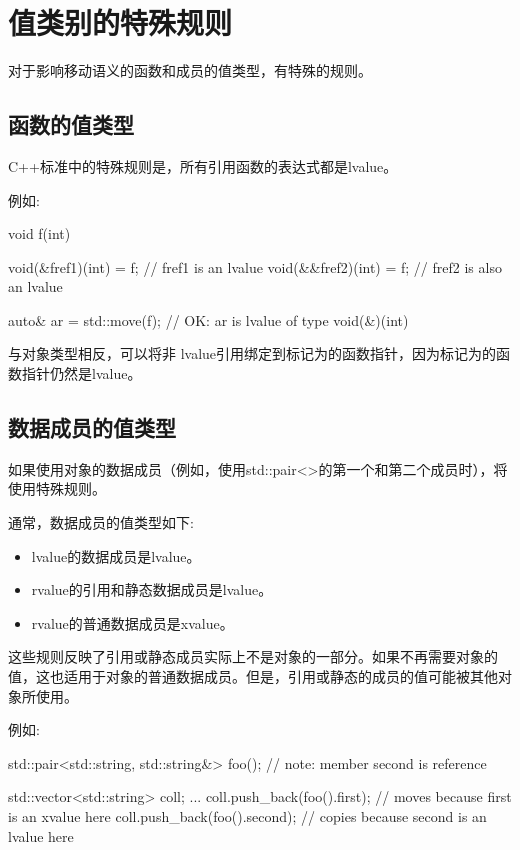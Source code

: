 \section{值类别的特殊规则}
对于影响移动语义的函数和成员的值类型，有特殊的规则。

\subsection{函数的值类型}

C++标准中的特殊规则是，所有引用函数的表达式都是lvalue。

例如:

\begin{cppcode}
void f(int) {
}

void(&fref1)(int) = f; // fref1 is an lvalue
void(&&fref2)(int) = f; // fref2 is also an lvalue

auto& ar = std::move(f); // OK: ar is lvalue of type void(&)(int)
\end{cppcode}

与对象类型相反，可以将非 lvalue引用绑定到标记为的函数指针，因为标记为的函数指针仍然是lvalue。

\subsection{数据成员的值类型}

如果使用对象的数据成员（例如，使用std::pair<>的第一个和第二个成员时），将使用特殊规则。

通常，数据成员的值类型如下:

\begin{itemize}
	\item lvalue的数据成员是lvalue。
	\item rvalue的引用和静态数据成员是lvalue。
	\item rvalue的普通数据成员是xvalue。
\end{itemize}

这些规则反映了引用或静态成员实际上不是对象的一部分。如果不再需要对象的值，这也适用于对象的普通数据成员。但是，引用或静态的成员的值可能被其他对象所使用。

例如:

\begin{cppcode}
std::pair<std::string, std::string&> foo(); // note: member second is reference

std::vector<std::string> coll;
...
coll.push_back(foo().first); // moves because first is an xvalue here
coll.push_back(foo().second); // copies because second is an lvalue here
\end{cppcode}

